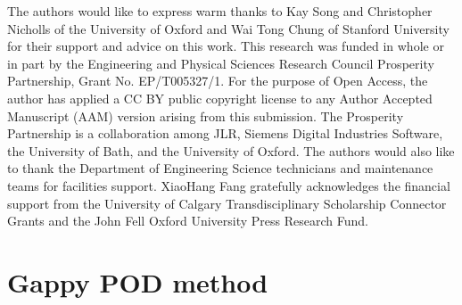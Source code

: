 \documentclass{article}
\begin{document}
\clearpage
\begin{ack}

The authors would like to express warm thanks to Kay Song and Christopher Nicholls of the University of Oxford and Wai Tong Chung of Stanford University for their support and advice on this work. This research was funded in whole or in part by the Engineering and Physical Sciences Research Council Prosperity Partnership, Grant No. EP/T005327/1. For the purpose of Open Access, the author has applied a CC BY public copyright license to any Author Accepted Manuscript (AAM) version arising from this submission. The Prosperity Partnership is a collaboration among JLR, Siemens Digital Industries Software, the University of Bath, and the University of Oxford. The authors would also like to thank the Department of Engineering Science technicians and maintenance teams for facilities support. XiaoHang Fang gratefully acknowledges the financial support from the University of Calgary Transdisciplinary Scholarship Connector Grants and the John Fell Oxford University Press Research Fund.
\end{ack}



\small




\clearpage 
\appendix

\section{Gappy POD method}
\label{app:gpod}
\end{document}
